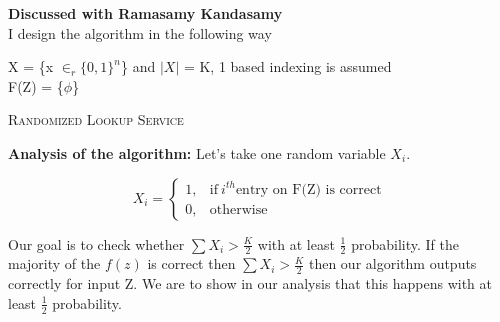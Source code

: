 \documentclass[addpoints,12pt]{exam}
\begin{document}
\begin{questions}
  
		\begin{solution} \textbf{Discussed with Ramasamy Kandasamy}\\
            I design the algorithm in the following way
            \newpage
            \begin{algorithm}[H]
                
            	\BlankLine
                X = \{x $\in_r \{0,1\}^n$\} and $|X|$ = K, 1 based indexing is assumed\\
                F(Z) = \{$\phi$\}\\
            	\caption{\textsc{Randomized Lookup Service}}
            \end{algorithm}

            \textbf{Analysis of the algorithm:} Let's take one random variable \textbf{$X_i$}.

            \begin{equation}
                X_i=
                \begin{cases}
                  1, & \text{if}\ i^{th} \text{entry on F(Z) is correct}\\
                  0, & \text{otherwise}
                \end{cases}
            \end{equation}

            Our goal is to check whether $\displaystyle\sum X_i > \frac{K}{2}$ with at least $\frac{1}{2}$ probability. If the majority of the $f(z)$ is correct then $\displaystyle\sum X_i > \frac{K}{2}$ then our algorithm outputs correctly for input Z. We are to show in our analysis that this happens with at least $\frac{1}{2}$ probability.


\end{solution}
\end{questions}
\end{document}
